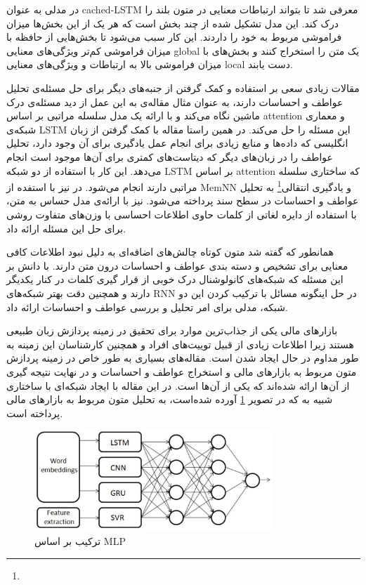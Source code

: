 \documentclass[12pt, a4paper, oneside]{report}
\begin{document}
در
\cite{xu2016cached}
مدلی به عنوان
cached-LSTM
معرفی شد تا بتواند ارتباطات معنایی در متون بلند را درک کند. این مدل تشکیل شده از چند بخش است که هر یک از این
بخش‌ها میزان فراموشی مربوط به خود را داردند. این کار سبب می‌شود تا بخش‌هایی از حافظه با میزان فراموشی کم‌تر ویژگی‌های
معنایی
global
یک متن را استخراج کنند و بخش‌های با میزان فراموشی بالا به ارتباطات و ویژگی‌های معنایی
local
دست یابند.

مقالات زیادی سعی بر استفاده و کمک گرفتن از جنبه‌های دیگر برای حل مسئله‌ی تحلیل عواطف و احساسات دارند،
به عنوان مثال مقاله‌ی
\cite{yin-etal-2017-document}
به این عمل از دید مسئله‌ی درک ماشین نگاه می‌کند و با ارائه یک مدل سلسله مراتبی بر اساس
attention
و معماری شبکه‌ی
LSTM
این مسئله را حل می‌کند.
در همین راستا مقاله
\cite{zhou-etal-2016-attention}
با کمک گرفتن از زبان انگلیسی که داده‌ها و منابع زیادی برای انجام عمل یادگیری برای آن وجود دارد، تحلیل
عواطف را در زبان‌های دیگر که دیتاست‌های کمتری برای آن‌ها موجود است انجام می‌دهد. این کار با استفاده از دو شبکه
LSTM
بر اساس
attention
که ساختاری سلسله مراتبی دارند انجام می‌شود.
در
\cite{ijcai2017-311}
نیز با استفده از
MemNN
و
یادگیری انتقالی\footnote{}
به تحلیل عواطف و احساسات در سطح سند پرداخته می‌شود.
\cite{teng-etal-2016-context}
نیز با ارائه‌ی مدل
حساس به متن، با استفاده از دایره لغاتی از کلمات حاوی اطلاعات احساسی با وزن‌های متفاوت روشی برای حل این مسئله ارائه داد.

همانطور که گفته شد متون کوتاه چالش‌های اضافه‌ای به دلیل نبود اطلاعات کافی معنایی برای تشخیص و دسته بندی عواطف
و احساسات درون متن دارند.
\cite{wang-etal-2016-combination}
با دانش بر این مسئله که شبکه‌های کانولوشنال درک خوبی از قرار گیری کلمات در کنار یکدیگر دارند و همچنین دقت
بهتر شبکه‌های
RNN
در حل اینگونه مسائل با ترکیب کردن این دو شبکه، مدلی برای امر تحلیل و بررسی عواطف و احساسات ارائه داد.

بازارهای مالی یکی از جذاب‌ترین موارد برای تحقیق در زمینه پردازش زبان طبیعی هستند زیرا اطلاعات زیادی از قبیل
توییت‌های افراد و همچنین کارشناسان این زمینه به طور مداوم در حال ایجاد شدن است. مقاله‌های بسیاری به طور خاص در زمینه
پردازش متون مربوط به بازارهای مالی و استخراج عواطف و احساسات و در نهایت نتیجه گیری از آن‌ها ارائه شده‌اند که
\cite{akhtar2017multilayer}
یکی از آن‌ها است. در این مقاله با ایجاد شبکه‌ای با ساختاری شبیه به
که در تصویر
\ref{fig:MLP-ensemble}
آورده شده‌است، به تحلیل متون مربوط به بازار‌های مالی پرداخته است.

\begin{figure}[!ht]
    \centering
    \includegraphics[width=0.8\textwidth]{MLPENSEMBLE}
    \caption{ ترکیب بر اساس MLP }
    \label{fig:MLP-ensemble}
\end{figure}
\end{document}
